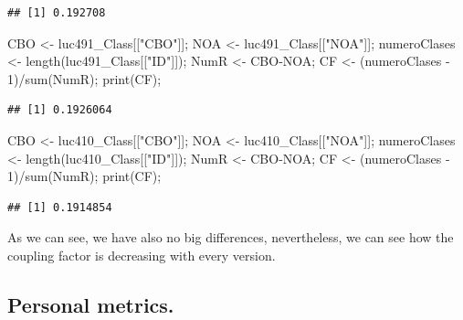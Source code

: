\documentclass[
]{article}
\newenvironment{Shaded}{\begin{snugshade}}{\end{snugshade}}
\newcommand{\DecValTok}[1]{\textcolor[rgb]{0.00,0.00,0.81}{#1}}
\newcommand{\FunctionTok}[1]{\textcolor[rgb]{0.00,0.00,0.00}{#1}}
\newcommand{\NormalTok}[1]{#1}
\newcommand{\OtherTok}[1]{\textcolor[rgb]{0.56,0.35,0.01}{#1}}
\newcommand{\SpecialCharTok}[1]{\textcolor[rgb]{0.00,0.00,0.00}{#1}}
\newcommand{\StringTok}[1]{\textcolor[rgb]{0.31,0.60,0.02}{#1}}
\begin{document}
\begin{verbatim}
## [1] 0.192708
\end{verbatim}

\begin{Shaded}
\begin{Highlighting}[]
\NormalTok{CBO }\OtherTok{\textless{}{-}}\NormalTok{ luc491\_Class[[}\StringTok{"CBO"}\NormalTok{]];}
\NormalTok{NOA }\OtherTok{\textless{}{-}}\NormalTok{ luc491\_Class[[}\StringTok{"NOA"}\NormalTok{]];}
\NormalTok{numeroClases }\OtherTok{\textless{}{-}} \FunctionTok{length}\NormalTok{(luc491\_Class[[}\StringTok{"ID"}\NormalTok{]]);}
\NormalTok{NumR }\OtherTok{\textless{}{-}}\NormalTok{ CBO}\SpecialCharTok{{-}}\NormalTok{NOA;}
\NormalTok{CF }\OtherTok{\textless{}{-}}\NormalTok{ (numeroClases }\SpecialCharTok{{-}} \DecValTok{1}\NormalTok{)}\SpecialCharTok{/}\FunctionTok{sum}\NormalTok{(NumR);}
\FunctionTok{print}\NormalTok{(CF);}
\end{Highlighting}
\end{Shaded}

\begin{verbatim}
## [1] 0.1926064
\end{verbatim}

\begin{Shaded}
\begin{Highlighting}[]
\NormalTok{CBO }\OtherTok{\textless{}{-}}\NormalTok{ luc410\_Class[[}\StringTok{"CBO"}\NormalTok{]];}
\NormalTok{NOA }\OtherTok{\textless{}{-}}\NormalTok{ luc410\_Class[[}\StringTok{"NOA"}\NormalTok{]];}
\NormalTok{numeroClases }\OtherTok{\textless{}{-}} \FunctionTok{length}\NormalTok{(luc410\_Class[[}\StringTok{"ID"}\NormalTok{]]);}
\NormalTok{NumR }\OtherTok{\textless{}{-}}\NormalTok{ CBO}\SpecialCharTok{{-}}\NormalTok{NOA;}
\NormalTok{CF }\OtherTok{\textless{}{-}}\NormalTok{ (numeroClases }\SpecialCharTok{{-}} \DecValTok{1}\NormalTok{)}\SpecialCharTok{/}\FunctionTok{sum}\NormalTok{(NumR);}
\FunctionTok{print}\NormalTok{(CF);}
\end{Highlighting}
\end{Shaded}

\begin{verbatim}
## [1] 0.1914854
\end{verbatim}

As we can see, we have also no big differences, nevertheless, we can see
how the coupling factor is decreasing with every version.

\hypertarget{personal-metrics.}{%
\subsection{Personal metrics.}\label{personal-metrics.}}
\end{document}
